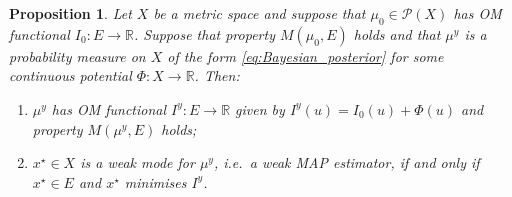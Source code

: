 \documentclass[11pt]{article}
\newcommand*{\prob}[1]{\mathscr{P}(#1)}
\newcommand*{\Reals}{\mathbb{R}}
\theoremstyle{plain}
\newtheorem{proposition}[theorem]{Proposition}
\theoremstyle{definition}
\numberwithin{equation}{section}
\numberwithin{figure}{section}
\numberwithin{table}{section}
\begin{document}
\begin{proposition}
	\label{prop:OM_minimisers_are_modes}
	Let $X$ be a metric space and suppose that $\mu_{0} \in \prob{X}$ has OM functional $I_{0} \colon E \to \Reals$.
	Suppose that property $M(\mu_0, E)$ holds and that $\mu^{y}$ is a probability measure on $X$ of the form \eqref{eq:Bayesian_posterior} for some continuous potential $\Phi \colon X \to \Reals$.
	Then:
	\begin{enumerate}[label=(\alph*)]
		\item
		\label{item:OM_minimisers_are_modes_1}
		$\mu^y$ has OM functional $I^y \colon E \to \Reals$ given by $I^y(u) = I_0(u) + \Phi(u)$ and property $M(\mu^y, E)$ holds;

		\item
		\label{item:OM_minimisers_are_modes_2}
		$x^{\star} \in X$ is a weak mode for $\mu^{y}$, i.e.\ a weak MAP estimator, if and only if $x^{\star} \in E$ and $x^{\star}$ minimises $I^y$.
	\end{enumerate}
\end{proposition}
\end{document}
